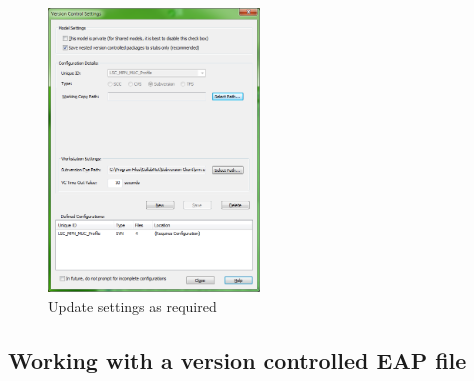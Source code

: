 \begin{enumerate}
\begin{figure}[!htbp]
\begin{center}
	\includegraphics[width=0.5\textwidth]{012}
	\caption{Update settings as required}
  	\label{fig:advanced-topics-eaSVN-setWorkingCopyPath}
\end{center}
\end{figure}

\end{enumerate}



\subsection{Working with a version controlled EAP file}
\label{sect:appendixB_update_commit}

